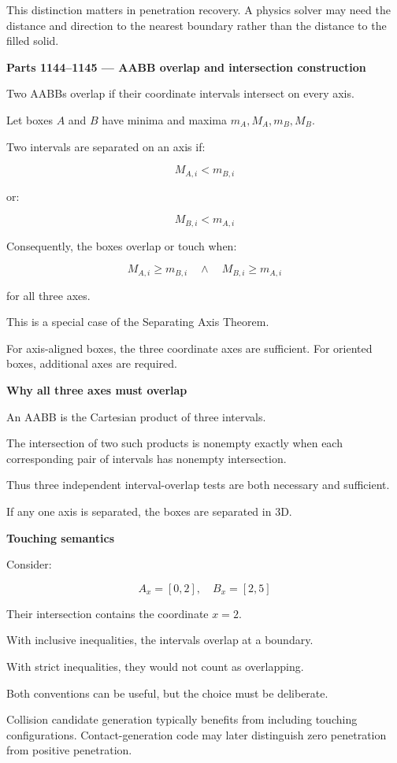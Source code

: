 This distinction matters in penetration recovery. A physics solver may need the distance and direction to the nearest boundary rather than the distance to the filled solid.

\textbf{Parts 1144--1145 --- AABB overlap and intersection construction}

Two AABBs overlap if their coordinate intervals intersect on every axis.

Let boxes \(A\) and \(B\) have minima and maxima \(m_A,M_A,m_B,M_B\).

Two intervals are separated on an axis if:

\[
M_{A,i}<m_{B,i}
\]

or:

\[
M_{B,i}<m_{A,i}
\]

Consequently, the boxes overlap or touch when:

\[
\boxed{ M_{A,i}\ge m_{B,i} \quad\land\quad M_{B,i}\ge m_{A,i} }
\]

for all three axes.

This is a special case of the Separating Axis Theorem.

For axis-aligned boxes, the three coordinate axes are sufficient. For oriented boxes, additional axes are required.

\textbf{Why all three axes must overlap}

An AABB is the Cartesian product of three intervals.

The intersection of two such products is nonempty exactly when each corresponding pair of intervals has nonempty intersection.

Thus three independent interval-overlap tests are both necessary and sufficient.

If any one axis is separated, the boxes are separated in 3D.

\textbf{Touching semantics}

Consider:

\[
A_x=[0,2],\quad B_x=[2,5]
\]

Their intersection contains the coordinate \(x=2\).

With inclusive inequalities, the intervals overlap at a boundary.

With strict inequalities, they would not count as overlapping.

Both conventions can be useful, but the choice must be deliberate.

Collision candidate generation typically benefits from including touching configurations. Contact-generation code may later distinguish zero penetration from positive penetration.

